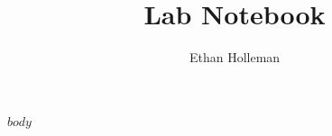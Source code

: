 \documentclass[]{article}
\title{Lab Notebook}
\author{Ethan Holleman}
\begin{document}
\maketitle

$body$ 
\end{document}
